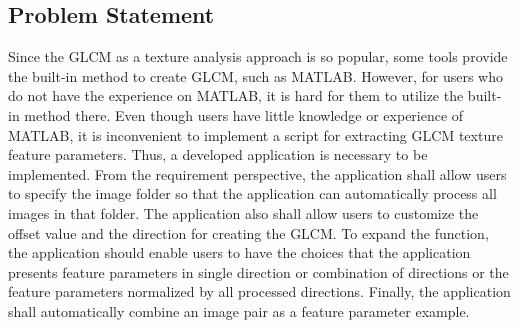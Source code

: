 \subsection{Problem Statement}
Since the GLCM as a texture analysis approach is so popular, some tools provide the built-in method to create GLCM, such as MATLAB. However, for users who do not have the experience on MATLAB, it is hard for them to utilize the built-in method there. Even though users have little knowledge or experience of MATLAB, it is inconvenient to implement a script for extracting GLCM texture feature parameters. Thus, a developed application is necessary to be implemented. From the requirement perspective, the application shall allow users to specify the image folder so that the application can automatically process all images in that folder. The application also shall allow users to customize the offset value and the direction for creating the GLCM. To expand the function, the application should enable users to have the choices that the application presents feature parameters in single direction or combination of directions or the feature parameters normalized by all processed directions. Finally, the application shall automatically combine an image pair as a feature parameter example.  
